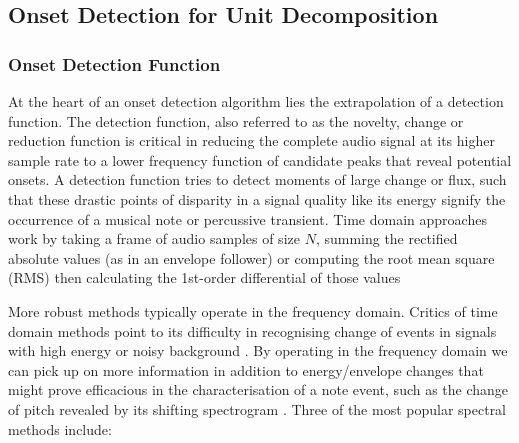 \subsection{Onset Detection for Unit Decomposition}

%

\subsubsection{Onset Detection Function}

At the heart of an onset detection algorithm lies the extrapolation of a detection function. The detection function, also referred to as the novelty, change or reduction function is critical in reducing the complete audio signal at its higher sample rate to a lower frequency function of candidate peaks that reveal potential onsets. A detection function tries to detect moments of large change or flux, such that these drastic points of disparity in a signal quality like its energy signify the occurrence of a musical note or percussive transient. Time domain approaches work by taking a frame of audio samples of size $N$, summing the rectified absolute values (as in an envelope follower) or computing the root mean square (RMS) then calculating the 1st-order differential of those values \citep{Laroche2003, Duxbury2002}

More robust methods typically operate in the frequency domain. Critics of time domain methods point to its difficulty in recognising change of events in signals with high energy or noisy background \citep{Grzywczak2014, Eyben2010}. By operating in the frequency domain we can pick up on more information in addition to energy/envelope changes that might prove efficacious in the characterisation of a note event, such as the change of pitch revealed by its shifting spectrogram \citep{Schloss1985, Lerch2012}. Three of the most popular spectral methods include:

